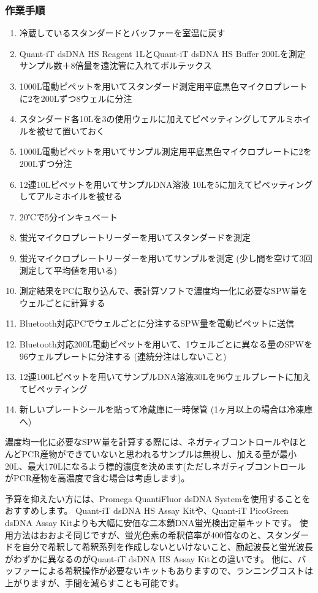 \documentclass[titlepage,10pt,a4paper,uplatex]{jsbook}
\begin{document}
\subsubsection{作業手順}
\begin{enumerate}
\item 冷蔵しているスタンダードとバッファーを室温に戻す
\item Quant-iT dsDNA HS Reagent 1{\textmu}LとQuant-iT dsDNA HS Buffer 200{\textmu}Lを測定サンプル数＋8倍量を遠沈管に入れてボルテックス
\item 1000{\textmu}L電動ピペットを用いてスタンダード測定用平底黒色マイクロプレートに2を200{\textmu}Lずつ8ウェルに分注
\item スタンダード各10{\textmu}Lを3の使用ウェルに加えてピペッティングしてアルミホイルを被せて置いておく
\item 1000{\textmu}L電動ピペットを用いてサンプル測定用平底黒色マイクロプレートに2を200{\textmu}Lずつ分注
\item 12連10{\textmu}Lピペットを用いてサンプルDNA溶液 10{\textmu}Lを5に加えてピペッティングしてアルミホイルを被せる
\item 20℃で5分インキュベート
\item 蛍光マイクロプレートリーダーを用いてスタンダードを測定
\item 蛍光マイクロプレートリーダーを用いてサンプルを測定 (少し間を空けて3回測定して平均値を用いる)
\item 測定結果をPCに取り込んで、表計算ソフトで濃度均一化に必要なSPW量をウェルごとに計算する
\item Bluetooth対応PCでウェルごとに分注するSPW量を電動ピペットに送信
\item Bluetooth対応200{\textmu}L電動ピペットを用いて、1ウェルごとに異なる量のSPWを96ウェルプレートに分注する (連続分注はしないこと)
\item 12連100{\textmu}Lピペットを用いてサンプルDNA溶液30{\textmu}Lを96ウェルプレートに加えてピペッティング
\item 新しいプレートシールを貼って冷蔵庫に一時保管 (1ヶ月以上の場合は冷凍庫へ)
\end{enumerate}

濃度均一化に必要なSPW量を計算する際には、ネガティブコントロールやほとんどPCR産物ができていないと思われるサンプルは無視し、加える量が最小20{\textmu}L、最大170{\textmu}Lになるよう標的濃度を決めます(ただしネガティブコントロールがPCR産物を高濃度で含む場合は考慮します)。

予算を抑えたい方には、Promega QuantiFluor dsDNA Systemを使用することをおすすめします。
Quant-iT dsDNA HS Assay Kitや、Quant-iT PicoGreen dsDNA Assay Kitよりも大幅に安価な二本鎖DNA蛍光検出定量キットです。
使用方法はおおよそ同じですが、蛍光色素の希釈倍率が400倍なのと、スタンダードを自分で希釈して希釈系列を作成しないといけないこと、励起波長と蛍光波長がわずかに異なるのがQuant-iT dsDNA HS Assay Kitとの違いです。
他に、バッファーによる希釈操作が必要ないキットもありますので、ランニングコストは上がりますが、手間を減らすことも可能です。
\end{document}
